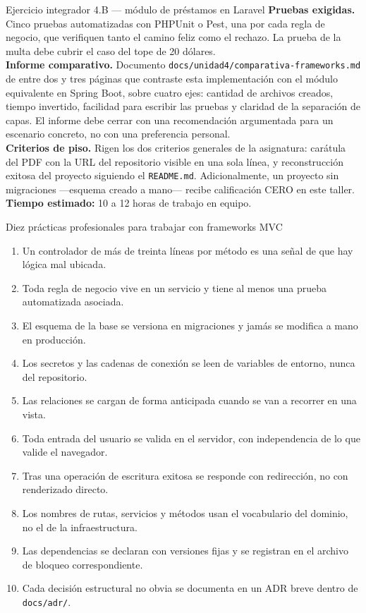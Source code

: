 \documentclass[11pt,a4paper,openany]{book}
\begin{document}
\begin{cajaejercicio}{Ejercicio integrador 4.B --- módulo de préstamos en Laravel}
	\textbf{Pruebas exigidas.} Cinco pruebas automatizadas con PHPUnit o Pest, una por cada regla de negocio, que verifiquen tanto el camino feliz como el rechazo. La prueba de la multa debe cubrir el caso del tope de 20 dólares.\\[4pt]
	\textbf{Informe comparativo.} Documento \texttt{docs/unidad4/comparativa-frameworks.md} de entre dos y tres páginas que contraste esta implementación con el módulo equivalente en Spring Boot, sobre cuatro ejes: cantidad de archivos creados, tiempo invertido, facilidad para escribir las pruebas y claridad de la separación de capas. El informe debe cerrar con una recomendación argumentada para un escenario concreto, no con una preferencia personal.\\[4pt]
	\textbf{Criterios de piso.} Rigen los dos criterios generales de la asignatura: carátula del PDF con la URL del repositorio visible en una sola línea, y reconstrucción exitosa del proyecto siguiendo el \texttt{README.md}. Adicionalmente, un proyecto sin migraciones ---esquema creado a mano--- recibe calificación CERO en este taller.\\[4pt]
	\textbf{Tiempo estimado:} 10 a 12 horas de trabajo en equipo.
\end{cajaejercicio}

\begin{cajabuenas}{Diez prácticas profesionales para trabajar con frameworks MVC}
	\begin{enumerate}
		\item Un controlador de más de treinta líneas por método es una señal de que hay lógica mal ubicada.
		\item Toda regla de negocio vive en un servicio y tiene al menos una prueba automatizada asociada.
		\item El esquema de la base se versiona en migraciones y jamás se modifica a mano en producción.
		\item Los secretos y las cadenas de conexión se leen de variables de entorno, nunca del repositorio.
		\item Las relaciones se cargan de forma anticipada cuando se van a recorrer en una vista.
		\item Toda entrada del usuario se valida en el servidor, con independencia de lo que valide el navegador.
		\item Tras una operación de escritura exitosa se responde con redirección, no con renderizado directo.
		\item Los nombres de rutas, servicios y métodos usan el vocabulario del dominio, no el de la infraestructura.
		\item Las dependencias se declaran con versiones fijas y se registran en el archivo de bloqueo correspondiente.
		\item Cada decisión estructural no obvia se documenta en un ADR breve dentro de \texttt{docs/adr/}.
	\end{enumerate}
\end{cajabuenas}
\end{document}
